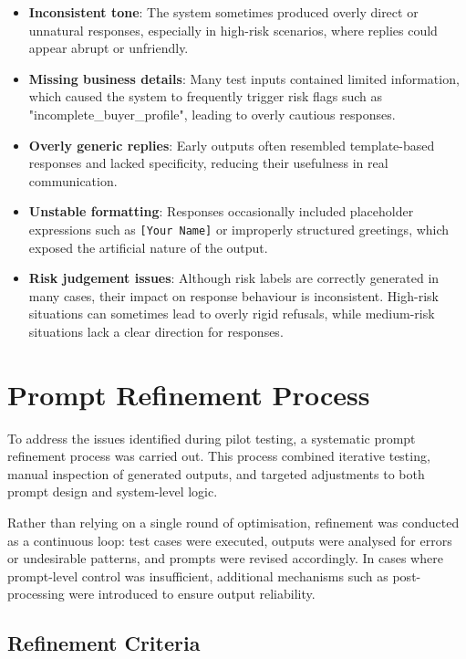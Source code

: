 \documentclass[12pt,a4paper]{report}
\begin{document}
\begin{itemize}
    \item \textbf{Inconsistent tone}: The system sometimes produced overly direct or unnatural responses, especially in high-risk scenarios, where replies could appear abrupt or unfriendly.
    
    \item \textbf{Missing business details}: Many test inputs contained limited information, which caused the system to frequently trigger risk flags such as "incomplete\_buyer\_profile", leading to overly cautious responses.
    
    \item \textbf{Overly generic replies}: Early outputs often resembled template-based responses and lacked specificity, reducing their usefulness in real communication.
    
    \item \textbf{Unstable formatting}: Responses occasionally included placeholder expressions such as \texttt{[Your Name]} or improperly structured greetings, which exposed the artificial nature of the output.
    
    \item \textbf{Risk judgement issues}: Although risk labels are correctly generated in many cases, their impact on response behaviour is inconsistent. High-risk situations can sometimes lead to overly rigid refusals, while medium-risk situations lack a clear direction for responses.
\end{itemize}


\section{Prompt Refinement Process}

To address the issues identified during pilot testing, a systematic prompt refinement process was carried out. This process combined iterative testing, manual inspection of generated outputs, and targeted adjustments to both prompt design and system-level logic.

Rather than relying on a single round of optimisation, refinement was conducted as a continuous loop: test cases were executed, outputs were analysed for errors or undesirable patterns, and prompts were revised accordingly. In cases where prompt-level control was insufficient, additional mechanisms such as post-processing were introduced to ensure output reliability.

\subsection{Refinement Criteria}
\end{document}
